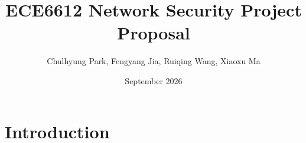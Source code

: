 \documentclass{article}
\title{ECE6612 Network Security Project Proposal}
\author{Chulhyung Park, Fengyang Jia, Ruiqing Wang, Xiaoxu Ma}
\date{September 2026}
\begin{document}
\maketitle

\section{Introduction}
\end{document}
